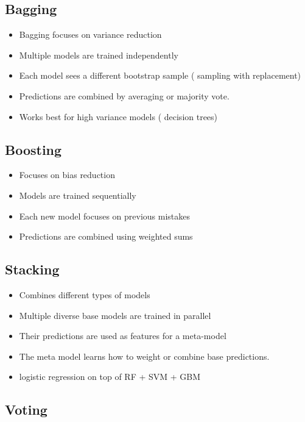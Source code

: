 \documentclass[10pt,a4paper]{article}
\begin{document}
		\subsection{Bagging}
	
		\begin{itemize}
			\item Bagging focuses on variance reduction
			\item Multiple models are trained independently
			\item Each model sees a different bootstrap sample ( sampling with replacement)
			\item Predictions are combined by averaging or majority vote.
			\item Works best for high variance models ( decision trees)
		\end{itemize}
	
		\subsection{Boosting}
	
		\begin{itemize}
			\item Focuses on bias reduction
			\item Models are trained sequentially
			\item Each new model focuses on previous mistakes
			\item Predictions are combined using weighted sums
		\end{itemize}
	
		\subsection{Stacking}
	
		\begin{itemize}
			\item Combines different types of models
			\item Multiple diverse base models are trained in parallel
			\item Their predictions are used as features for a meta-model
			\item The meta model learns how to weight or combine base predictions.
			\item logistic regression on top of RF + SVM + GBM
		\end{itemize}
	
		\subsection{Voting}
	
\end{document}
